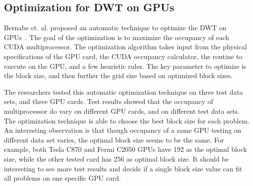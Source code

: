 \subsection{Optimization for DWT on GPUs}
\label{sec:optimize}
%
Bernabe et. al. proposed an automatic technique to optimize the DWT on 
GPUs~\cite{bernabe2013optimization}.
%
The goal of the optimization is to maximize the occupancy of each CUDA 
multiprocessor.
%
The optimization algorithm takes input from the physical specifications 
of the GPU card, the CUDA occupancy calculator, the routine to execute
on the GPU, and a few heuristic rules.
%
The key parameter to optimize is the block size, and then further the 
grid size based on optimized block sizes.


The researchers tested this automatic optimization technique on three
test data sets, and three GPU cards.
%
Test results showed that the occupancy of multiprocessor do vary on 
different GPU cards, and on different test data sets.
%
The optimization technique is able to choose the best block size for 
each problem.
%
An interesting observation is that though occupancy of a same GPU 
testing on different data set varies, the optimal block size seems
to be the same. 
%
For example, both Tesla C870 and Fermi C2050 GPUs have 192 as the optimal
block size, while the other tested card has 256 as optimal block size.
%
It should be interesting to see more test results and decide if a single 
block size value can fit all problems on one specific GPU card.


